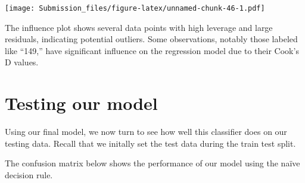 \documentclass[
]{article}
\newenvironment{Shaded}{\begin{snugshade}}{\end{snugshade}}
\newcommand{\AttributeTok}[1]{\textcolor[rgb]{0.13,0.29,0.53}{#1}}
\newcommand{\CommentTok}[1]{\textcolor[rgb]{0.56,0.35,0.01}{\textit{#1}}}
\newcommand{\DecValTok}[1]{\textcolor[rgb]{0.00,0.00,0.81}{#1}}
\newcommand{\FloatTok}[1]{\textcolor[rgb]{0.00,0.00,0.81}{#1}}
\newcommand{\FunctionTok}[1]{\textcolor[rgb]{0.13,0.29,0.53}{\textbf{#1}}}
\newcommand{\NormalTok}[1]{#1}
\newcommand{\OtherTok}[1]{\textcolor[rgb]{0.56,0.35,0.01}{#1}}
\newcommand{\SpecialCharTok}[1]{\textcolor[rgb]{0.81,0.36,0.00}{\textbf{#1}}}
\newcommand{\StringTok}[1]{\textcolor[rgb]{0.31,0.60,0.02}{#1}}
\begin{document}
\texttt{[image: Submission\_files/figure-latex/unnamed-chunk-46-1.pdf]}

The influence plot shows several data points with high leverage and
large residuals, indicating potential outliers. Some observations,
notably those labeled like ``149,'' have significant influence on the
regression model due to their Cook's D values.

\hypertarget{testing-our-model}{%
\section{Testing our model}\label{testing-our-model}}

Using our final model, we now turn to see how well this classifier does
on our testing data. Recall that we initally set the test data during
the train test split.

The confusion matrix below shows the performance of our model using the
naïve decision rule.

\begin{Shaded}
\end{Shaded}
\end{document}

